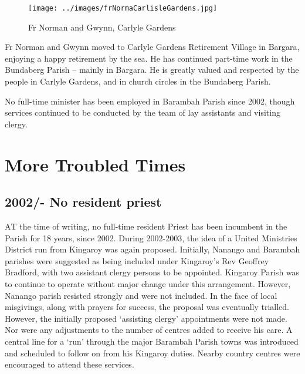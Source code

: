 \begin{figure}
\begin{center}
\texttt{[image: ../images/frNormaCarlisleGardens.jpg]}
\caption{Fr Norman and Gwynn, Carlyle Gardens}
\end{center}
\end{figure}




Fr Norman and Gwynn moved to Carlyle Gardens Retirement Village in Bargara, enjoying a happy retirement by the sea. He has continued part-time work in the Bundaberg Parish -- mainly in Bargara. He is greatly valued and respected by the people in Carlyle Gardens, and in church circles in the Bundaberg Parish.



No full-time minister has been employed in Barambah Parish since 2002, though services continued to be conducted by the team of lay assistants and visiting clergy.



\balance


\printendnotes[custom]
\setcounter{endnote}{0}
\chapter{More Troubled Times}
\nobalance


\section{2002/- No resident priest}



\lettrine[lines=3]{A}{T}
 the time of writing, no full-time resident Priest has been incumbent in the Parish for 18 years, since 2002. During 2002-2003, the idea of a United Ministries District run from Kingaroy was again proposed. Initially, Nanango and Barambah parishes were suggested as being included under Kingaroy's Rev Geoffrey Bradford, with two assistant clergy persons to be appointed. Kingaroy Parish was to continue to operate without major change under this arrangement. However, Nanango parish resisted strongly and were not included. In the face of local misgivings, along with prayers for success, the proposal was eventually trialled. However, the initially proposed `assisting clergy' appointments were not made. Nor were any adjustments to the number of centres added to receive his care. A central line for a `run' through the major Barambah Parish towns was introduced and scheduled to follow on from his Kingaroy duties. Nearby country centres were encouraged to attend these services.

